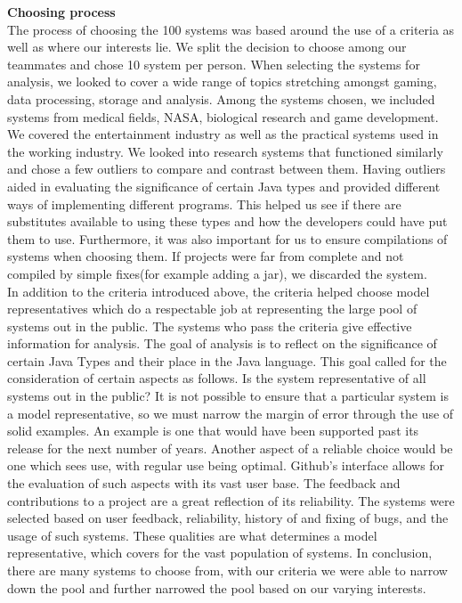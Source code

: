 \documentclass{assignment}
\begin{document}
\textbf{Choosing process}\\

	The process of choosing the 100 systems was based around the use of a criteria as well as where our interests lie. We split the decision to choose among our teammates and chose 10 system per person. When selecting the systems for analysis, we looked to cover a wide range of topics stretching amongst gaming, data processing, storage and analysis. Among the systems chosen, we included systems from medical fields, NASA, biological research and game development. We covered the entertainment industry as well as the practical systems used in the working industry. We looked into research systems that functioned similarly and chose a few outliers to compare and contrast between them. Having outliers aided in evaluating the significance of certain Java types and provided different ways of implementing different programs. This helped us see if there are substitutes available to using these types and how the developers could have put them to use. Furthermore, it was also important for us to ensure compilations of systems when choosing them. If projects were far from complete and not compiled by simple fixes(for example adding a jar), we discarded the system.\\

	In addition to the criteria introduced above, the criteria helped choose model representatives which do a respectable job at representing the large pool of systems out in the public. The systems who pass the criteria give effective information for analysis. The goal of analysis is to reflect on the significance of certain Java Types and their place in the Java language. This goal called for the consideration of certain aspects as follows.  Is the system representative of all systems out in the public? It is not possible to ensure that a particular system is a model representative, so we must narrow the margin of error through the use of solid examples. An example is one that would have been supported past its release for the next number of years. Another aspect of a reliable choice would be one which sees use, with regular use being optimal. Github’s interface allows for the evaluation of such aspects with its vast user base. The feedback and contributions to a project are a great reflection of its reliability. The systems were selected based on user feedback, reliability, history of and fixing of bugs, and the usage of such systems. These qualities are what determines a model representative, which covers for the vast population of systems. In conclusion, there are many systems to choose from, with our criteria we were able to narrow down the pool and further narrowed the pool based on our varying interests.\\
\end{document}
